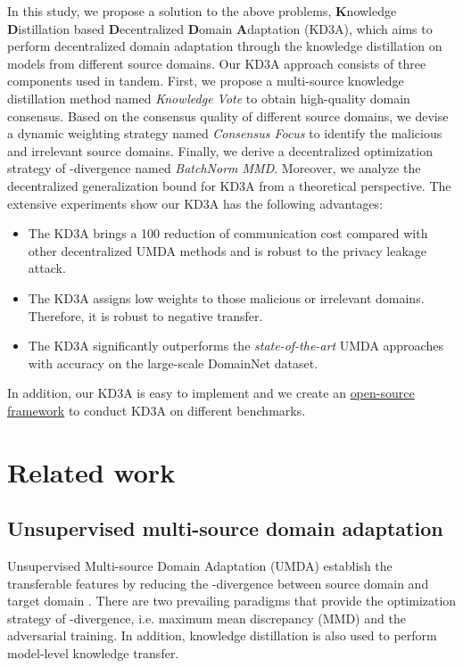 \documentclass{article}
\begin{document}
In this study, we propose a solution to the above problems, \textbf{K}nowledge \textbf{D}istillation based \textbf{D}ecentralized \textbf{D}omain \textbf{A}daptation (KD3A), which aims to perform decentralized domain adaptation through the knowledge distillation on  models from different source domains. Our KD3A approach consists of three components used in tandem. First, we propose a multi-source knowledge distillation method named \textit{Knowledge Vote} to obtain high-quality domain consensus. Based on the consensus quality of different source domains, we devise a dynamic weighting strategy named \textit{Consensus Focus} to identify the malicious and irrelevant source domains. Finally, we derive a decentralized optimization strategy of -divergence named \textit{BatchNorm MMD}. Moreover, we analyze the decentralized generalization bound for KD3A from a theoretical perspective. The extensive experiments show our KD3A has the following advantages:
\begin{itemize}
    \item The KD3A brings a 100 reduction of communication cost compared with other decentralized UMDA methods and is robust to the privacy leakage attack.
    \item The KD3A assigns low weights to those malicious or irrelevant domains. Therefore, it is robust to negative transfer.
    \item The KD3A significantly outperforms the \textit{state-of-the-art} UMDA approaches with  accuracy on the large-scale DomainNet dataset. 
\end{itemize}
In addition, our KD3A is easy to implement and we create an \href{https://github.com/ICML2021-13/KD3A}{open-source framework} to conduct KD3A on different benchmarks. \section{Related work}
\subsection{Unsupervised multi-source domain adaptation}
Unsupervised Multi-source Domain Adaptation (UMDA) establish the transferable features by reducing the -divergence between source domain  and target domain . There are two prevailing paradigms that provide the optimization strategy of -divergence, i.e. maximum mean discrepancy (MMD) and the adversarial training. In addition, knowledge distillation is also used to perform model-level knowledge transfer.
\end{document}
